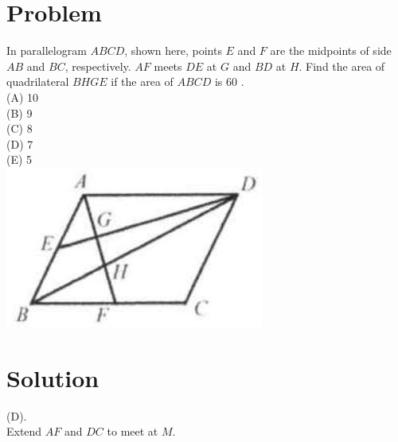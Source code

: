 \documentclass{article}
\begin{document}
\section*{Problem}
In parallelogram \(A B C D\), shown here, points \(E\) and \(F\) are the midpoints of side \(A B\) and \(B C\), respectively. \(A F\) meets \(D E\) at \(G\) and \(B D\) at \(H\). Find the area of quadrilateral \(B H G E\) if the area of \(A B C D\) is 60 .\\
(A) 10\\
(B) 9\\
(C) 8\\
(D) 7\\
(E) 5\\
\centering
\includegraphics[width=\textwidth]{images/129(1).jpg}

\section*{Solution}
(D).\\
Extend \(A F\) and \(D C\) to meet at \(M\).
\end{document}
